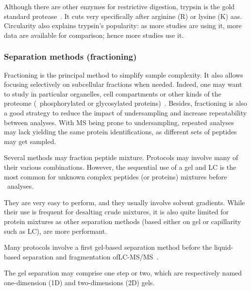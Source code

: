 Although there are other enzymes for restrictive digestion,
trypsin is the gold standard protease~.
It cuts very specifically after arginine (R) or lysine (K) \glspl{aa}.
Circularity also explains trypsin's popularity:
as more studies are using it, more data are available for comparison;
hence more studies use it.

\subsubsection{Separation methods (fractioning)}\label{subsub:sepMethods}
Fractioning is the principal method to simplify sample complexity. It also allows
focusing selectively on subcellular fractions when needed. Indeed, one may want
to study in particular organelles, cell compartments or other kinds of the proteome
(\eg\ phosphorylated or glycosylated proteins)~. Besides,
fractioning is also a good strategy to reduce the impact of undersampling and
increase repeatability between analyses.
With \gls{MS} being prone to undersampling,
repeated analyses may lack yielding the same
protein identifications,
as different sets of peptides may get sampled.

Several methods may fraction peptide mixture. Protocols may involve many of their
various combinations. However, the sequential use of a gel and \gls{LC} is
the most common for unknown complex peptides (or proteins) mixtures before
\ms\ analyses.

They are very easy to perform, and they usually involve solvent gradients. While
their use is frequent for desalting crude mixtures, it is also quite limited
for protein mixtures as other separation methods (based either on gel or
capillarity such as \gls{LC}), are more performant.

Many protocols involve a first gel-based separation method before the
liquid-based separation and fragmentation of\enspace\gls{LC-MS/MS}~.

The gel separation may comprise one step or two, which are respectively named
one-dimension (1D) and two-dimensions (2D) gels.

